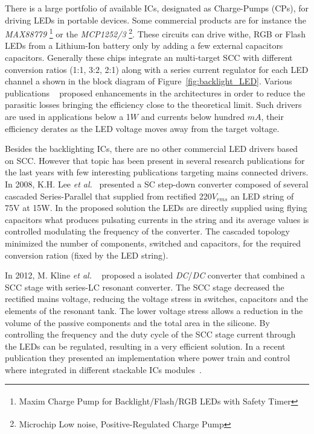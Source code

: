 There is a large portfolio of available ICs, designated as Charge-Pumps (CPs), for driving LEDs in portable devices. Some commercial products are for instance  the \emph{MAX88779} \footnote{Maxim\textsuperscript{\textregistered} Charge Pump for Backlight/Flash/RGB LEDs with Safety Timer } or the \emph{MCP1252/3} \footnote{Microchip\textsuperscript{\textregistered} Low noise, Positive-Regulated Charge Pump}. These circuits  can drive withe, RGB or Flash LEDs from a Lithium-Ion battery only by adding a few external capacitors capacitors.  Generally these chips integrate an multi-target SCC with different conversion ratios (1:1, 3:2, 2:1) along with a series current regulator for each LED channel a shown in the block diagram of Figure~\ref{fig:backlight_LED}. Various publications ~\cite{07Feng,09Wu,10Yin} proposed enhancements in the architectures in order to reduce the parasitic losses bringing the efficiency close to the theoretical limit. Such drivers are used in applications below a 1$W$ and currents below hundred $mA$, their efficiency derates as the LED voltage moves away from the target voltage.

Besides the backlighting ICs, there are no other commercial LED drivers based on SCC. However that topic has been present in several research publications for the last years with few interesting publications targeting mains connected drivers. In 2008, K.H. Lee \emph{et al.}~\cite{08Lee} presented a SC step-down converter composed of several cascaded Series-Parallel that supplied from rectified 220$V_{rms}$ an LED string of 75V at 15W. In the proposed solution the LEDs are directly supplied using flying capacitors what produces pulsating currents in the string and its average values is controlled modulating the frequency of the converter. The cascaded topology minimized the number of components, switched and capacitors, for the required conversion ration (fixed by the LED string).

In 2012, M. Kline \emph{et al.} ~\cite{12Kline} proposed a isolated \emph{DC}/\emph{DC} converter that combined a SCC stage with series-LC resonant converter.  The SCC stage decreased  the rectified mains voltage, reducing the voltage stress in switches, capacitors and the elements of the resonant tank. The lower voltage stress allows a reduction in the volume of the passive components and the total area in the silicone. By controlling the frequency and the duty cycle of the SCC stage current through the LEDs can be regulated, resulting in a very efficient solution. In a recent publication they presented an implementation where power train and control where integrated in different stackable ICs modules~\cite{13Kline}.

